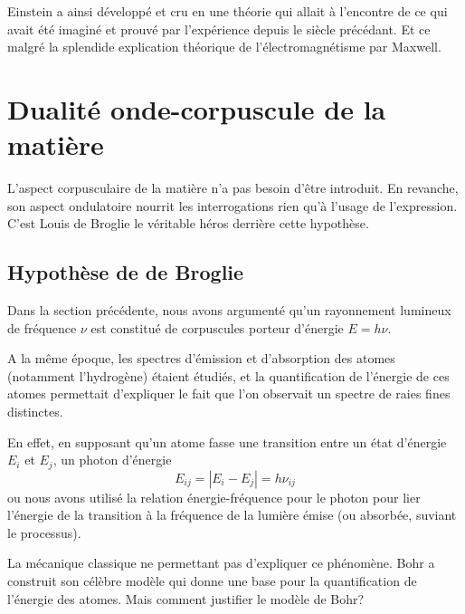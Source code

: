 \documentclass{book}
\begin{document}
Einstein a ainsi développé et cru en une théorie qui allait à l'encontre de ce qui avait été imaginé et prouvé par l'expérience depuis le siècle précédant. Et ce malgré la splendide explication théorique de l'électromagnétisme par Maxwell.

\section{Dualité onde-corpuscule de la matière}
L'aspect corpusculaire de la matière n'a pas besoin d'être introduit. En revanche, son aspect ondulatoire nourrit les interrogations rien qu'à l'usage de l'expression. C'est Louis de Broglie le véritable héros derrière cette hypothèse.

\subsection{Hypothèse de de Broglie}

Dans la section précédente, nous avons argumenté qu'un rayonnement lumineux de fréquence $\nu$ est constitué de corpuscules porteur d'énergie $E = h \nu$. 

A la même époque, les spectres d'émission et d'absorption des atomes (notamment l'hydrogène) étaient étudiés, et la quantification de l'énergie de ces atomes permettait d'expliquer le fait que l'on observait un spectre de raies fines distinctes. 

En effet, en supposant qu'un atome fasse une transition entre un état d'énergie $E_i$ et $E_j$, un photon d'énergie 
$$E_{ij} =  |E_i - E_j|= h\nu_{ij} $$
ou nous avons utilisé la relation énergie-fréquence pour le photon pour lier 
l'énergie de la transition à la fréquence de la lumière émise (ou absorbée, suviant le processus).



La mécanique classique ne permettant pas d'expliquer ce phénomène.
Bohr a construit son célèbre modèle qui donne une base pour la quantification de l'énergie des atomes. Mais comment justifier le modèle de Bohr?
\end{document}

